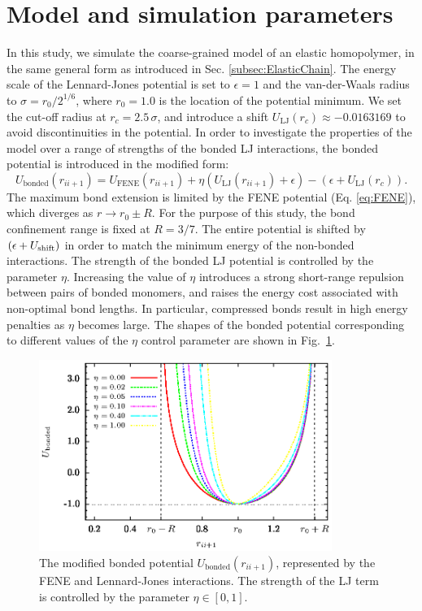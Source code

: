 \documentclass[12pt]{report}
\begin{document}
\section{Model and simulation parameters}
In this study, we simulate the coarse-grained model of an elastic homopolymer, in the same general form as introduced in Sec.\,\,\ref{subsec:ElasticChain}. The energy scale of the Lennard-Jones potential is set to $\epsilon=1$ and the van-der-Waals radius to $\sigma=r_0/2^{1/6}$, where $r_0 = 1.0$ is the location of the potential minimum. We set the cut-off radius at $r_c=2.5\,\sigma$, and introduce a shift $U_{\mathrm{LJ}}(r_{c}) \approx -0.0163169$ to avoid discontinuities in the potential. In order to investigate the properties of the model over a range of strengths of the bonded LJ interactions, the bonded potential is introduced in the modified form:
%
\begin{equation}
\label{eq:BondedInteractionModified}
U_{\mathrm{bonded}}(r_{ii+1}) = U_{\mathrm{FENE}}(r_{ii+1}) + \eta \left(U_{\mathrm{LJ}}(r_{ii+1}) + \epsilon\right) - \left(\epsilon + U_{\mathrm{LJ}}(r_{c})\right).
\end{equation}
%
The maximum bond extension is limited by the FENE potential (Eq.\,\,\ref{eq:FENE}), which diverges as $r \rightarrow r_0 \pm R$. For the purpose of this study, the bond confinement range is fixed at $R = 3/7$. The entire potential is shifted by $(\epsilon+U_{\rm shift})$ in order to match the minimum energy of the non-bonded interactions. The strength of the bonded LJ potential is controlled by the parameter $\eta$. Increasing the value of $\eta$ introduces a strong short-range repulsion between pairs of bonded monomers, and raises the energy cost associated with non-optimal bond lengths. In particular, compressed bonds result in high energy penalties as $\eta$ becomes large. The shapes of the bonded potential corresponding to different values of the $\eta$ control parameter are shown in Fig.~\ref{fig:modifiedBondedPotential}. 
%
\begin{figure}
\center
\includegraphics[width=0.85\textwidth]{chapter6Figs/bondedInter.eps}\hspace{2pc}%
\caption{\label{fig:modifiedBondedPotential} The modified bonded potential $U_{\mathrm{bonded}}(r_{ii+1})$, represented by the FENE and Lennard-Jones interactions. The strength of the LJ term is controlled by the parameter $\eta \in [0,1]$.}
\end{figure}
\end{document}
